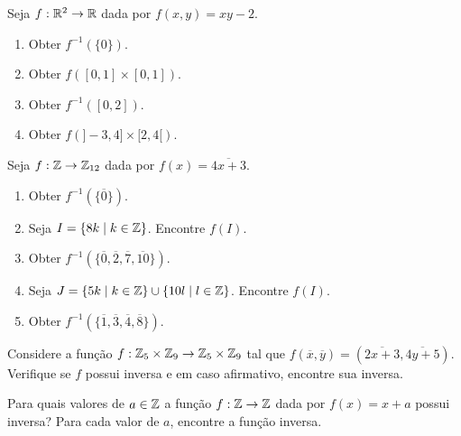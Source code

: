 \documentclass[12pt]{exam}
\begin{document}
\vspace{.3cm}

\questao{} Seja $f: \mathbb{R}^2 \to \mathbb{R}$ dada por $f(x,y) = xy - 2$.
\begin{multicols}{2}
    \begin{enumerate}[label={\alph*})]
        \item Obter $f^{-1}(\{0\})$.

        \item Obter $f([0,1]\times [0,1])$.

        \item Obter $f^{-1}([0,2])$.

        \item Obter $f(]-3,4]\times [2,4[)$.
    \end{enumerate}
\end{multicols}

\vspace{.3cm}

\questao{} Seja $f : \mathbb{Z} \to \mathbb{Z}_{12}$ dada por $f(x) = \overline{4x + 3}$.
\begin{enumerate}[label={\alph*})]
    \item Obter $f^{-1}(\{\overline{0}\})$.

    \item Seja $I = \{8k \mid k \in \mathbb{Z}\}$. Encontre $f(I)$.

    \item Obter $f^{-1}(\{\overline{0}, \overline{2}, \overline{7}, \overline{10}\})$.

    \item Seja $J = \{5k \mid k \in \mathbb{Z}\} \cup \{10l \mid l \in \mathbb{Z}\}$. Encontre $f(I)$.

    \item Obter $f^{-1}(\{\overline{1}, \overline{3}, \overline{4}, \overline{8}\})$.
\end{enumerate}

\vspace{.3cm}

\questao{} Considere a função $f : \mathbb{Z}_5 \times \mathbb{Z}_9 \to \mathbb{Z}_5 \times \mathbb{Z}_9$ tal que $f(\overline{x},\overline{y}) = (\overline{2x + 3}, \overline{4y + 5})$. Verifique se $f$ possui inversa e em caso afirmativo, encontre sua inversa.

\vspace{.3cm}

\questao{} Para quais valores de $a \in \mathbb{Z}$ a função $f : \mathbb{Z} \to \mathbb{Z}$ dada por $f(x)       = x + a$ possui inversa? Para cada valor de $a$, encontre a função inversa.
\end{document}
